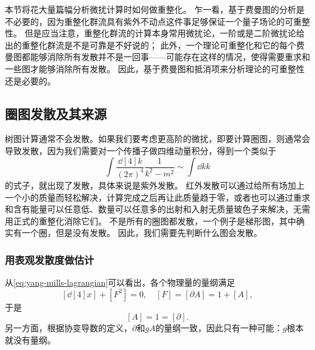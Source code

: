 \documentclass[hyperref, UTF8, a4paper]{ctexart}
\begin{document}
本节将花大量篇幅分析微扰计算时如何做重整化。
乍一看，基于费曼图的分析是不必要的，因为重整化群流具有紫外不动点这件事足够保证一个量子场论的可重整性。
但是应当注意，重整化群流的计算本身常用微扰论，一阶或是二阶微扰论给出的重整化群流是不是可靠是不好说的；
此外，一个理论可重整化和它的每个费曼图都能够消除所有发散并不是一回事——可能存在这样的情况，使得需要重求和一些图才能够消除所有发散。
因此，基于费曼图和抵消项来分析理论的可重整性还是必要的。

\subsection{圈图发散及其来源}

树图计算通常不会发散。如果我们要考虑更高阶的微扰，即要计算圈图，则通常会导致发散，因为我们需要对一个传播子做四维动量积分，得到一个类似于
\[
    \int \frac{\dd[4]{k}}{(2\pi)^4} \frac{1}{k^2 - m^2} \sim \int \dd{k} k
\]
的式子，就出现了发散，具体来说是紫外发散。
红外发散可以通过给所有场加上一个小的质量而轻松解决，计算完成之后再让此质量趋于零，或者也可以通过重求和含有能量可以任意低、数量可以任意多的出射和入射无质量玻色子来解决，无需用正式的重整化消除它们。
不是所有的圈图都发散，一个例子是梯形图，其中确实有一个圈，但是没有发散。
因此，我们需要先判断什么图会发散。

\subsubsection{用表观发散度做估计}

从\eqref{eq:yang-mills-lagrangian}可以看出，各个物理量的量纲满足
\[
    [\dd[4]{x}] + [F^2] = 0, \quad [F] = [\partial A] = 1 + [A],
\]
于是
\[
    [A] = 1 = [\partial].
\]
另一方面，根据协变导数的定义，$\partial$和$g A$的量纲一致，因此只有一种可能：$g$根本就没有量纲。
\end{document}
